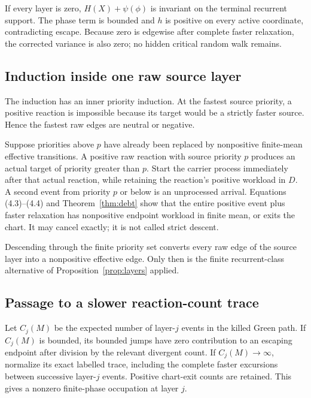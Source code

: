 \documentclass[11pt]{article}
\begin{document}
If every layer is zero, \(H(X)+\psi(\phi)\) is invariant on the terminal
recurrent support.  The phase term is bounded and \(h\) is positive on every
active coordinate, contradicting escape.  Because zero is edgewise after
complete faster relaxation, the corrected variance is also zero; no hidden
critical random walk remains.


\subsection{Induction inside one raw source layer}

The induction has an inner priority induction.  At the fastest source
priority, a positive reaction is impossible because its target would be a
strictly faster source.  Hence the fastest raw edges are neutral or negative.

Suppose priorities above \(p\) have already been replaced by nonpositive
finite-mean effective transitions.  A positive raw reaction with source
priority \(p\) produces an actual target of priority greater than \(p\).
Start the carrier process immediately after that actual reaction, while
retaining the reaction's positive workload in \(D\).  A second event from
priority \(p\) or below is an unprocessed arrival.  Equations
(4.3)--(4.4) and Theorem~\ref{thm:debt} show that the entire positive event
plus faster relaxation has nonpositive endpoint workload in finite mean, or
exits the chart.  It may cancel exactly; it is not called strict descent.

Descending through the finite priority set converts every raw edge of the
source layer into a nonpositive effective edge.  Only then is the finite
recurrent-class alternative of Proposition~\ref{prop:layers} applied.

\subsection{Passage to a slower reaction-count trace}

Let \(C_j(M)\) be the expected number of layer-\(j\) events in the killed
Green path.  If \(C_j(M)\) is bounded, its bounded jumps have zero
contribution to an escaping endpoint after division by the relevant divergent
count.  If \(C_j(M)\to\infty\), normalize its exact labelled trace, including
the complete faster excursions between successive layer-\(j\) events.
Positive chart-exit counts are retained.  This gives a nonzero finite-phase
occupation at layer \(j\).
\end{document}
